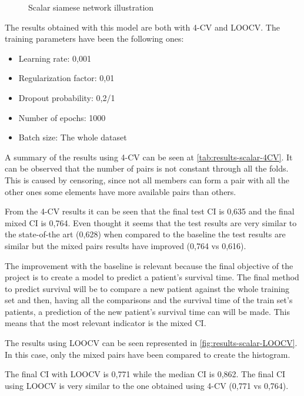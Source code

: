 \begin{figure}
  \centering
  
  \caption{Scalar siamese network illustration \label{fig:scalar-implement}}
\end{figure}


The results obtained with this model are both with 4-CV and \gls{LOOCV}. The training 
parameters have been the following ones:
\begin{itemize}
  \item Learning rate: 0,001
  \item Regularization factor: 0,01
  \item Dropout probability: 0,2/1
  \item Number of epochs: 1000
  \item Batch size: The whole dataset
\end{itemize}

A summary of the results using 4-CV can be seen at \autoref{tab:results-scalar-4CV}. It can be
observed that the number of pairs is not constant through all the folds. This is caused by
censoring, since not all members can form a pair with all the other ones some elements 
have more available pairs than others. 

From the 4-CV results it can be seen that the final test \gls{CI} is 0,635 and the final mixed 
\gls{CI} is 0,764. Even thought it seems that the test results are very similar to the
state-of-the art (0,628) when compared to the baseline the test results are similar but
the mixed pairs results have improved (0,764 vs 0,616).

The improvement with the baseline is relevant because the final objective of the project
is to create a model to predict a patient's survival time. The final method to predict
survival will be to compare a new patient against the whole training set and then, having
all the comparisons and the survival time of the train set's patients, a prediction of
the new patient's survival time can will be made. This means that the most relevant 
indicator is the mixed \gls{CI}.

The results using \gls{LOOCV} can be seen represented in \autoref{fig:results-scalar-LOOCV}. 
In this case, only the mixed pairs have been compared to create the histogram.

The final \gls{CI} with \gls{LOOCV} is 0,771 while the median \gls{CI} is 0,862. The final 
\gls{CI} using \gls{LOOCV} is very similar to the one obtained using 4-CV (0,771 vs 0,764).

